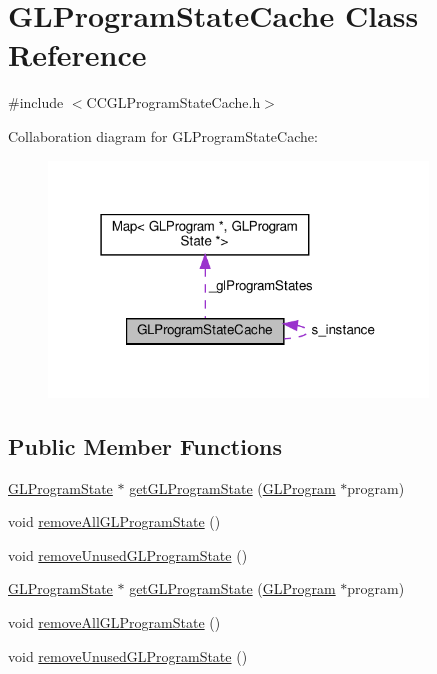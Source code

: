 \hypertarget{classGLProgramStateCache}{}\section{G\+L\+Program\+State\+Cache Class Reference}
\label{classGLProgramStateCache}


{\ttfamily \#include $<$C\+C\+G\+L\+Program\+State\+Cache.\+h$>$}



Collaboration diagram for G\+L\+Program\+State\+Cache\+:
\nopagebreak
\begin{figure}[H]
\begin{center}
\leavevmode
\includegraphics[width=286pt]{classGLProgramStateCache__coll__graph}
\end{center}
\end{figure}
\subsection*{Public Member Functions}
\begin{DoxyCompactItemize}
\item 
\hyperlink{classGLProgramState}{G\+L\+Program\+State} $\ast$ \hyperlink{classGLProgramStateCache_ab173364baeb13cf1e9d57f3005d6aadf}{get\+G\+L\+Program\+State} (\hyperlink{classGLProgram}{G\+L\+Program} $\ast$program)
\item 
void \hyperlink{classGLProgramStateCache_acb1c32915fb3afb44ec8acad112ef8d3}{remove\+All\+G\+L\+Program\+State} ()
\item 
void \hyperlink{classGLProgramStateCache_a0ddcd455f29dc479f871a06f4c898b35}{remove\+Unused\+G\+L\+Program\+State} ()
\item 
\hyperlink{classGLProgramState}{G\+L\+Program\+State} $\ast$ \hyperlink{classGLProgramStateCache_a16499f031722f40f5b8bd35310336f10}{get\+G\+L\+Program\+State} (\hyperlink{classGLProgram}{G\+L\+Program} $\ast$program)
\item 
void \hyperlink{classGLProgramStateCache_acb1c32915fb3afb44ec8acad112ef8d3}{remove\+All\+G\+L\+Program\+State} ()
\item 
void \hyperlink{classGLProgramStateCache_a0ddcd455f29dc479f871a06f4c898b35}{remove\+Unused\+G\+L\+Program\+State} ()
\end{DoxyCompactItemize}
